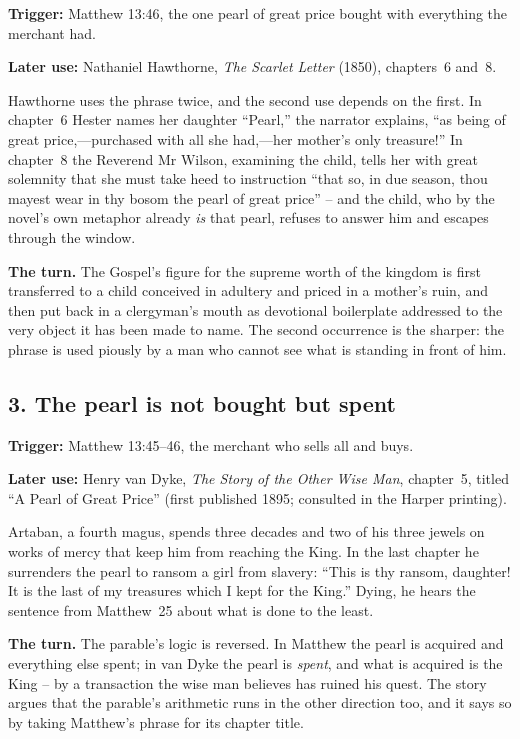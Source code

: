 \textbf{Trigger:} Matthew 13:46, the one pearl of great price bought with everything the merchant had.\par\noindent
\textbf{Later use:} Nathaniel Hawthorne, \emph{The Scarlet Letter} (1850), chapters~6 and~8.

Hawthorne uses the phrase twice, and the second use depends on the first. In chapter~6 Hester names her daughter ``Pearl,'' the narrator explains, ``as being of great price,---purchased with all she had,---her mother's only treasure!'' In chapter~8 the Reverend Mr Wilson, examining the child, tells her with great solemnity that she must take heed to instruction ``that so, in due season, thou mayest wear in thy bosom the pearl of great price'' -- and the child, who by the novel's own metaphor already \emph{is} that pearl, refuses to answer him and escapes through the window.

\textbf{The turn.} The Gospel's figure for the supreme worth of the kingdom is first transferred to a child conceived in adultery and priced in a mother's ruin, and then put back in a clergyman's mouth as devotional boilerplate addressed to the very object it has been made to name. The second occurrence is the sharper: the phrase is used piously by a man who cannot see what is standing in front of him.

\subsection*{3. The pearl is not bought but spent}

\textbf{Trigger:} Matthew 13:45--46, the merchant who sells all and buys.\par\noindent
\textbf{Later use:} Henry van Dyke, \emph{The Story of the Other Wise Man}, chapter~5, titled ``A Pearl of Great Price'' (first published 1895; consulted in the Harper printing).

Artaban, a fourth magus, spends three decades and two of his three jewels on works of mercy that keep him from reaching the King. In the last chapter he surrenders the pearl to ransom a girl from slavery: ``This is thy ransom, daughter! It is the last of my treasures which I kept for the King.'' Dying, he hears the sentence from Matthew~25 about what is done to the least.

\textbf{The turn.} The parable's logic is reversed. In Matthew the pearl is acquired and everything else spent; in van Dyke the pearl is \emph{spent}, and what is acquired is the King -- by a transaction the wise man believes has ruined his quest. The story argues that the parable's arithmetic runs in the other direction too, and it says so by taking Matthew's phrase for its chapter title.

